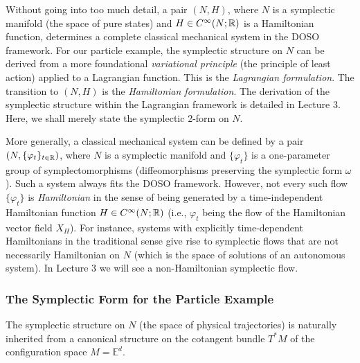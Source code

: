 Without going into too much detail, a pair $(N, H)$, where $N$ is a symplectic manifold (the space of pure states) and $H \in C^\infty(N;\mathbb{R})$ is a Hamiltonian function, determines a complete classical mechanical system in the DOSO framework. For our particle example, the symplectic structure on $N$ can be derived from a more foundational \emph{variational principle} (the principle of least action) applied to a Lagrangian function. This is the \emph{Lagrangian formulation}. The transition to $(N, H)$ is the \emph{Hamiltonian formulation}. The derivation of the symplectic structure within the Lagrangian framework is detailed in Lecture 3. Here, we shall merely state the symplectic 2-form on $N$.

\begin{remark} \label{rem:1.20}
More generally, a classical mechanical system can be defined by a pair $(N, \{\varphi_t\}_{t\in\mathbb{R}})$, where $N$ is a symplectic manifold and $\{\varphi_t\}$ is a one-parameter group of symplectomorphisms (diffeomorphisms preserving the symplectic form $\omega$). Such a system always fits the DOSO framework. However, not every such flow $\{\varphi_t\}$ is \emph{Hamiltonian} in the sense of being generated by a time-independent Hamiltonian function $H \in C^\infty(N;\mathbb{R})$ (i.e., $\varphi_t$ being the flow of the Hamiltonian vector field $X_H$). For instance, systems with explicitly time-dependent Hamiltonians in the traditional sense give rise to symplectic flows that are not necessarily Hamiltonian on $N$ (which is the space of solutions of an autonomous system). In Lecture 3 we will see a non-Hamiltonian symplectic flow.
\end{remark}

\subsubsection{The Symplectic Form for the Particle Example}

The symplectic structure on $N$ (the space of physical trajectories) is naturally inherited from a canonical structure on the cotangent bundle $T^*M$ of the configuration space $M = \mathbb{E}^d$.

